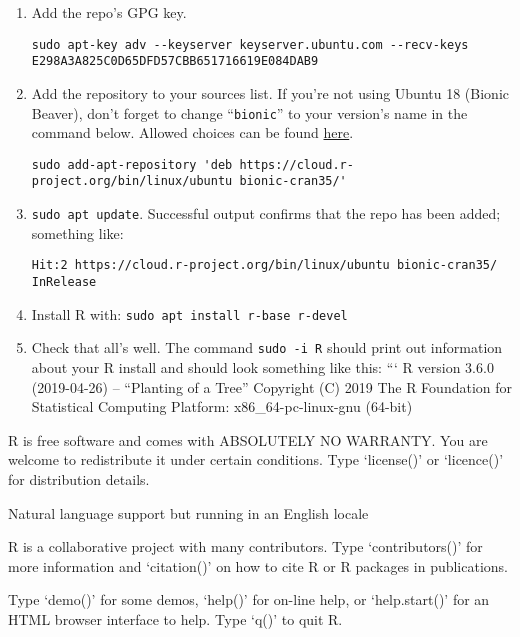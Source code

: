 \documentclass[]{book}
\begin{document}
\begin{enumerate}
\def\labelenumi{\arabic{enumi}.}
\item
  Add the repo's GPG key.

\begin{verbatim}
sudo apt-key adv --keyserver keyserver.ubuntu.com --recv-keys E298A3A825C0D65DFD57CBB651716619E084DAB9
\end{verbatim}
\item
  Add the repository to your sources list. If you're not using Ubuntu 18
  (Bionic Beaver), don't forget to change ``\texttt{bionic}'' to your
  version's name in the command below. Allowed choices can be found
  \href{https://cloud.r-project.org/bin/linux/ubuntu/}{here}.

\begin{verbatim}
sudo add-apt-repository 'deb https://cloud.r-project.org/bin/linux/ubuntu bionic-cran35/'
\end{verbatim}
\item
  \texttt{sudo\ apt\ update}. Successful output confirms that the repo
  has been added; something like:

\begin{verbatim}
Hit:2 https://cloud.r-project.org/bin/linux/ubuntu bionic-cran35/ InRelease
\end{verbatim}
\item
  Install R with: \texttt{sudo\ apt\ install\ r-base\ r-devel}
\item
  Check that all's well. The command \texttt{sudo\ -i\ R} should print
  out information about your R install and should look something like
  this: ``` R version 3.6.0 (2019-04-26) -- ``Planting of a Tree''
  Copyright (C) 2019 The R Foundation for Statistical Computing
  Platform: x86\_64-pc-linux-gnu (64-bit)
\end{enumerate}

R is free software and comes with ABSOLUTELY NO WARRANTY. You are
welcome to redistribute it under certain conditions. Type `license()' or
`licence()' for distribution details.

Natural language support but running in an English locale

R is a collaborative project with many contributors. Type
`contributors()' for more information and `citation()' on how to cite R
or R packages in publications.

Type `demo()' for some demos, `help()' for on-line help, or
`help.start()' for an HTML browser interface to help. Type `q()' to quit
R.
\end{document}
